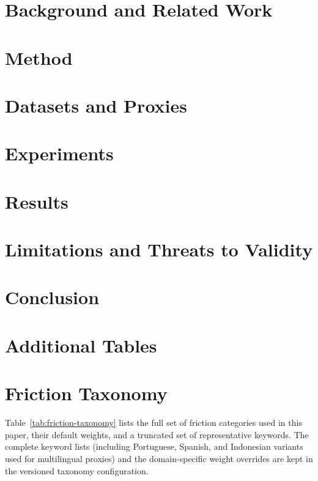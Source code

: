 \documentclass[10pt]{article}
\begin{document}
\section{Background and Related Work}


\section{Method}


\section{Datasets and Proxies}


\section{Experiments}


\section{Results}


\section{Limitations and Threats to Validity}


\section{Conclusion}


\FloatBarrier
\appendix
\section{Additional Tables}

\section{Friction Taxonomy}
Table~\ref{tab:friction-taxonomy} lists the full set of friction categories used in this paper, their default weights, and a truncated set of representative keywords. The complete keyword lists (including Portuguese, Spanish, and Indonesian variants used for multilingual proxies) and the domain-specific weight overrides are kept in the versioned taxonomy configuration.
\end{document}
